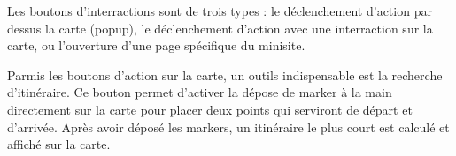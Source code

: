 Les boutons d'interractions sont de trois types : le déclenchement d'action par dessus la carte (popup), le déclenchement d'action avec une interraction sur la carte, ou l'ouverture d'une page spécifique du minisite.




Parmis les boutons d'action sur la carte, un outils indispensable est la recherche d'itinéraire. Ce bouton permet d'activer la dépose de marker à la main directement sur la carte pour placer deux points qui serviront de départ et d'arrivée. Après avoir déposé les markers, un itinéraire le plus court est calculé et affiché sur la carte.



